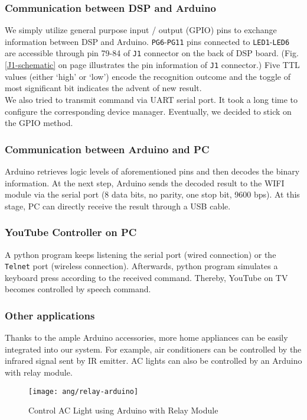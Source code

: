 \subsubsection{Communication between DSP and Arduino}
We simply utilize general purpose input / output (GPIO) pins to exchange information between DSP and Arduino. \texttt{PG6}-\texttt{PG11} pins connected to \texttt{LED1}-\texttt{LED6} are accessible through pin 79-84 of \texttt{J1} connector on the back of DSP board. (Fig. \ref{J1-schematic} on page \pageref{J1-schematic} illustrates the pin information of \texttt{J1} connector.) Five TTL values (either `high' or `low') encode the recognition outcome and the toggle of most significant bit indicates the advent of new result.\\

We also tried to transmit command via UART serial port. It took a long time to configure the corresponding device manager. Eventually, we decided to stick on the GPIO method.

\subsubsection{Communication between Arduino and PC}
Arduino retrieves logic levels of aforementioned pins and then decodes the binary information. At the next step, Arduino sends the decoded result to the WIFI module via the serial port (8 data bits, no parity, one stop bit, 9600 bps). At this stage, PC can directly receive the result through a USB cable.

\subsubsection{YouTube Controller on PC}
A python program keeps listening the serial port (wired connection) or the \texttt{Telnet} port (wireless connection). Afterwards, python program simulates a keyboard press according to the received command. Thereby, YouTube on TV becomes controlled by speech command.

\subsubsection{Other applications}
Thanks to the ample Arduino accessories, more home appliances can be easily integrated into our system. For example, air conditioners can be controlled by the infrared signal sent by IR emitter. AC lights can also be controlled by an Arduino with relay module.

\begin{figure}[H]
\centering
\texttt{[image: ang/relay-arduino]}
\caption{Control AC Light using Arduino with Relay Module \cite{relay-arduino}}
\label{relay-arduino}
\end{figure}
